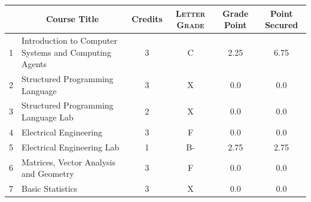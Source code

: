 \documentclass[11pt]{article}
\newcommand*{\numtwo}[1]{\pgfmathprintnumber[
                    fixed, precision=2, fixed zerofill=true]{#1}}
\begin{document}
                \begin{center}
                    \renewcommand{\arraystretch}{1.08}
                    
                \begin{tabular}{|c|l|c|>{\scshape}c|c|c|}
                \hline  \rule[-1ex]{0pt}{3.5ex} {\centering{\bf Course Code}} &  \multicolumn{1}{c|}{\textbf{Course Title}}  & {\bf Credits} & {\bf Letter Grade} & {\bf Grade Point} & {\bf Point Secured}  \\ 
                \hline   1 &  Introduction to Computer Systems and Computing Agents		 & 3 & C & 2.25 & 6.75 \\ %
                \hline   2 &  Structured Programming Language		 & 3 & X & 0.0 & 0.0 \\ %
                \hline   3 &  Structured Programming Language Lab		 & 2 & X & 0.0 & 0.0 \\ %
                \hline   4 &  Electrical Engineering		 & 3 & F & 0.0 & 0.0 \\ %
                \hline   5 &  Electrical Engineering Lab		 & 1 & B- & 2.75 & 2.75 \\ %
                \hline   6 &  Matrices, Vector Analysis and Geometry		 & 3 & F & 0.0 & 0.0 \\ %
                \hline   7 &  Basic Statistics		 & 3 & X & 0.0 & 0.0 \\ %

\hline                %
                \end{tabular}
                \end{center}
                \renewcommand{\arraystretch}{1.03}
\end{document}
